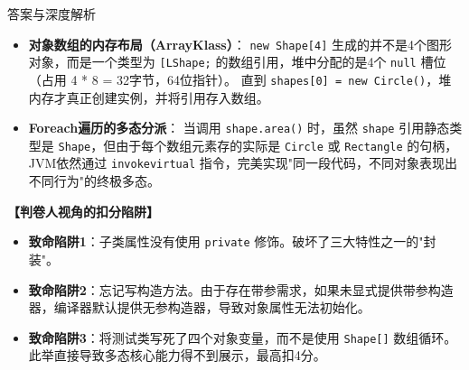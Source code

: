 \documentclass[12pt, a4paper]{ctexart}
\begin{document}
\begin{enumerate}[label=\textbf{\arabic*.}]
\begin{bluebox}{答案与深度解析}
\begin{itemize}[leftmargin=*, nosep]
			      \item \textbf{对象数组的内存布局（ArrayKlass）}：
			            \texttt{new Shape[4]} 生成的并不是4个图形对象，而是一个类型为 \texttt{[LShape;} 的数组引用，堆中分配的是4个 \texttt{null} 槽位（占用 4 * 8 = 32字节，64位指针）。
			            直到 \texttt{shapes[0] = new Circle()}，堆内存才真正创建实例，并将引用存入数组。

			      \item \textbf{Foreach遍历的多态分派}：
			            当调用 \texttt{shape.area()} 时，虽然 \texttt{shape} 引用静态类型是 \texttt{Shape}，但由于每个数组元素存的实际是 \texttt{Circle} 或 \texttt{Rectangle} 的句柄，JVM依然通过 \texttt{invokevirtual} 指令，完美实现"同一段代码，不同对象表现出不同行为"的终极多态。
		      \end{itemize}

		      \textbf{【判卷人视角的扣分陷阱】}
		      \begin{itemize}[leftmargin=*, nosep]
			      \item \textbf{致命陷阱1}：子类属性没有使用 \texttt{private} 修饰。破坏了三大特性之一的"封装"。
			      \item \textbf{致命陷阱2}：忘记写构造方法。由于存在带参需求，如果未显式提供带参构造器，编译器默认提供无参构造器，导致对象属性无法初始化。
			      \item \textbf{致命陷阱3}：将测试类写死了四个对象变量，而不是使用 \texttt{Shape[]} 数组循环。此举直接导致多态核心能力得不到展示，最高扣4分。
		      \end{itemize}
	      \end{bluebox}

\end{enumerate}
\end{document}
